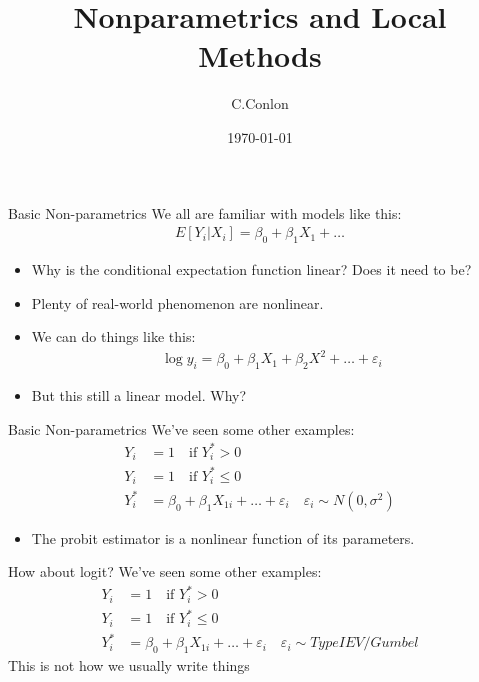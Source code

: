 \documentclass[11pt,handout,xcolor=pdftex,dvipsnames,table,mathserif,aspectratio=169]{beamer}
\title [Nonparametrics]{Nonparametrics and Local Methods}
\author{C.Conlon}
\institute{Applied Econometrics}
\date{\today}
\begin{document}
\begin{frame}
\titlepage
\end{frame}



\begin{frame}{Basic Non-parametrics}
We all are familiar with models like this:
\begin{eqnarray*}
E[Y_i | X_i ] = \beta_0 + \beta_1 X_1 + \ldots 
\end{eqnarray*}
\begin{itemize}
\item Why is the conditional expectation function linear? Does it need to be?
\item Plenty of real-world phenomenon are nonlinear.
\item We can do things like this:
\begin{eqnarray*}
\log y_i = \beta_0 + \beta_1 X_1 + \beta_2 X^2 + \ldots + \varepsilon_i
\end{eqnarray*}
\item But this still a \alert{linear model}. Why?
\end{itemize}
\end{frame}

\begin{frame}{Basic Non-parametrics}
We've seen some other examples:
\begin{align*}
Y_{i} &= 1 \quad \mbox{if } Y_i^* >0\\
Y_{i} &= 1 \quad \mbox{if } Y_i^* \leq 0\\
Y_i^* &= \beta_0 + \beta_1 X_{1i} + \ldots + \varepsilon_i \quad \varepsilon_i \sim N (0,\sigma^2)
\end{align*}
\begin{itemize}
\item The probit estimator is a nonlinear function of its parameters.
\end{itemize}
\end{frame}


\begin{frame}{How about logit?}
We've seen some other examples:
\begin{align*}
Y_{i} &= 1 \quad \mbox{if } Y_i^* >0\\
Y_{i} &= 1 \quad \mbox{if } Y_i^* \leq 0\\
Y_i^* &= \beta_0 + \beta_1 X_{1i} + \ldots + \varepsilon_i \quad \varepsilon_i \sim Type I EV / Gumbel
\end{align*}
This is not how we usually write things
\end{frame}
\end{document}
